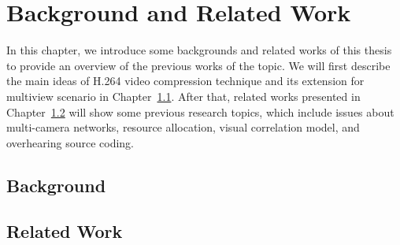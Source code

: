 \chapter{Background and Related Work}
\label{sec::backgroundAndRelatedWork}
In this chapter, we introduce some backgrounds and related works of this thesis to provide an overview of the previous works of the topic.
We will first describe the main ideas of H.264 video compression technique and its extension for multiview scenario in Chapter~\ref{sec::background}.
After that, related works presented in Chapter~\ref{sec::relatedWork} will show some previous research topics, which include issues about multi-camera networks, resource allocation, visual correlation model, and overhearing source coding.
%
\section{Background}
\label{sec::background}



%
\section{Related Work}
\label{sec::relatedWork}
